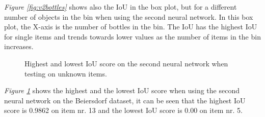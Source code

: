 \textit{Figure \ref{fig:v2bottles}} shows also the IoU in the box plot, but for a different number of objects in the bin when using the second neural network. In this box plot, the X-axis is the number of bottles in the bin. The IoU has the highest IoU for single items and trends towards lower values as the number of items in the bin increases.

\clearpage
\begin{figure}[h]
 \centering
 \hfill
 
 \caption{Highest and lowest IoU score on the second neural network when testing on unknown items.}
 \label{fig:v2unknowniou2}
\end{figure}

\textit{Figure \ref{fig:v2unknowniou2}} shows the highest and the lowest IoU score when using the second neural network on the Beiersdorf dataset, it can be seen that the highest IoU score is 0.9862 on item nr. 13 and the lowest IoU score is 0.00 on item nr. 5.

